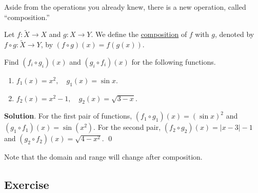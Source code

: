 \documentclass[11pt]{book}
\theoremstyle{break}
\theoremstyle{no_label}
\numberwithin{equation}{section}
\begin{document}
Aside from the operations you already knew, there is a new operation, called ``composition.''

\begin{definition}[Composition]
    Let $f:\tilde{X}\to X$ and $g:X\to Y$. We define the \underline{composition} of $f$ with $g$, denoted by $f\circ g:\tilde{X}\to Y$, by $(f\circ g)(x)=f(g(x))$.
\end{definition}

\begin{example}
    Find $(f_i\circ g_i)(x)$ and $(g_i\circ f_i)(x)$ for the following functions.
    \begin{enumerate}
        \item $f_1(x)=x^2, \quad g_1(x)=\sin x$.
        \item $f_2(x)=x^2-1, \quad g_2(x)=\sqrt{3-x}$.
    \end{enumerate}
\end{example}
\textbf{Solution}. For the first pair of functions, $(f_1\circ g_1)(x)=(\sin x)^2$ and $(g_1\circ f_1)(x)=\sin(x^2)$. For the second pair, $(f_2\circ g_2)(x)=|x-3|-1$ and $(g_2\circ f_2)(x)=\sqrt{4-x^2}$. \qed

Note that the domain and range will change after composition.

\subsection*{Exercise}

\setlength{\delimitershortfall}{0pt}
\end{document}
